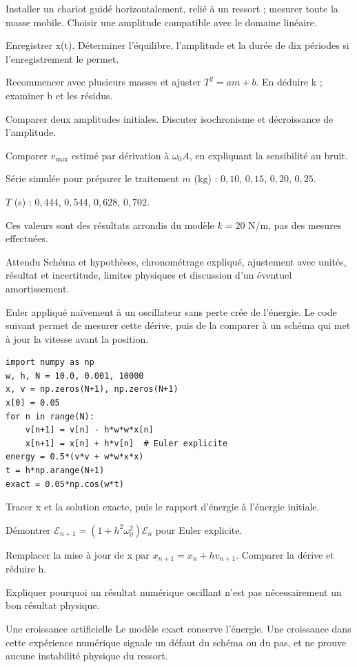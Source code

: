 \begin{questions}
\item Installer un chariot guidé horizontalement, relié à un ressort ; mesurer toute la masse mobile. Choisir une amplitude compatible avec le domaine linéaire.
\item Enregistrer x(t). Déterminer l’équilibre, l’amplitude et la durée de dix périodes si l’enregistrement le permet.
\item Recommencer avec plusieurs masses et ajuster $T^2=am+b$. En déduire k ; examiner b et les résidus.
\item Comparer deux amplitudes initiales. Discuter isochronisme et décroissance de l’amplitude.
\item Comparer $v_{\max}$ estimé par dérivation à $\omega_0A$, en expliquant la sensibilité au bruit.
\end{questions}
\begin{docu}{Série simulée pour préparer le traitement}
$m$ (kg) : $0{,}10$, $0{,}15$, $0{,}20$, $0{,}25$.\par $T$ (s) : $0{,}444$, $0{,}544$, $0{,}628$, $0{,}702$.\par Ces valeurs sont des résultats arrondis du modèle $k=20$ N/m, pas des mesures effectuées.
\end{docu}
\begin{methode}{Attendu}
Schéma et hypothèses, chronométrage expliqué, ajustement avec unités, résultat et incertitude, limites physiques et discussion d’un éventuel amortissement.
\end{methode}


Euler appliqué naïvement à un oscillateur sans perte crée de l’énergie. Le code suivant permet de mesurer cette dérive, puis de la comparer à un schéma qui met à jour la vitesse avant la position.
\begin{verbatim}
import numpy as np
w, h, N = 10.0, 0.001, 10000
x, v = np.zeros(N+1), np.zeros(N+1)
x[0] = 0.05
for n in range(N):
    v[n+1] = v[n] - h*w*w*x[n]
    x[n+1] = x[n] + h*v[n]  # Euler explicite
energy = 0.5*(v*v + w*w*x*x)
t = h*np.arange(N+1)
exact = 0.05*np.cos(w*t)
\end{verbatim}
\begin{questions}
\item Tracer x et la solution exacte, puis le rapport d’énergie à l’énergie initiale.
\item Démontrer $\mathcal E_{n+1}=(1+h^2\omega_0^2)\mathcal E_n$ pour Euler explicite.
\item Remplacer la mise à jour de x par $x_{n+1}=x_n+h v_{n+1}$. Comparer la dérive et réduire h.
\item Expliquer pourquoi un résultat numérique oscillant n’est pas nécessairement un bon résultat physique.
\end{questions}
\begin{piege}{Une croissance artificielle}
Le modèle exact conserve l’énergie. Une croissance dans cette expérience numérique signale un défaut du schéma ou du pas, et ne prouve aucune instabilité physique du ressort.
\end{piege}


